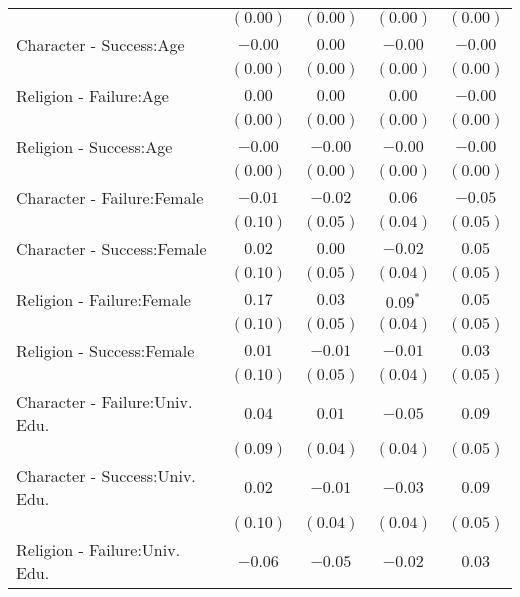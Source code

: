 \begin{table}[H]
\begin{center}
\begin{scriptsize}
\begin{tabular}{l c c c c}
                               & $(0.00)$     & $(0.00)$     & $(0.00)$     & $(0.00)$     \\
Character - Success:Age        & $-0.00$      & $0.00$       & $-0.00$      & $-0.00$      \\
                               & $(0.00)$     & $(0.00)$     & $(0.00)$     & $(0.00)$     \\
Religion - Failure:Age         & $0.00$       & $0.00$       & $0.00$       & $-0.00$      \\
                               & $(0.00)$     & $(0.00)$     & $(0.00)$     & $(0.00)$     \\
Religion - Success:Age         & $-0.00$      & $-0.00$      & $-0.00$      & $-0.00$      \\
                               & $(0.00)$     & $(0.00)$     & $(0.00)$     & $(0.00)$     \\
Character - Failure:Female     & $-0.01$      & $-0.02$      & $0.06$       & $-0.05$      \\
                               & $(0.10)$     & $(0.05)$     & $(0.04)$     & $(0.05)$     \\
Character - Success:Female     & $0.02$       & $0.00$       & $-0.02$      & $0.05$       \\
                               & $(0.10)$     & $(0.05)$     & $(0.04)$     & $(0.05)$     \\
Religion - Failure:Female      & $0.17$       & $0.03$       & $0.09^{*}$   & $0.05$       \\
                               & $(0.10)$     & $(0.05)$     & $(0.04)$     & $(0.05)$     \\
Religion - Success:Female      & $0.01$       & $-0.01$      & $-0.01$      & $0.03$       \\
                               & $(0.10)$     & $(0.05)$     & $(0.04)$     & $(0.05)$     \\
Character - Failure:Univ. Edu. & $0.04$       & $0.01$       & $-0.05$      & $0.09$       \\
                               & $(0.09)$     & $(0.04)$     & $(0.04)$     & $(0.05)$     \\
Character - Success:Univ. Edu. & $0.02$       & $-0.01$      & $-0.03$      & $0.09$       \\
                               & $(0.10)$     & $(0.04)$     & $(0.04)$     & $(0.05)$     \\
Religion - Failure:Univ. Edu.  & $-0.06$      & $-0.05$      & $-0.02$      & $0.03$       \\

\end{tabular}
\end{scriptsize}
\end{center}
\end{table}
